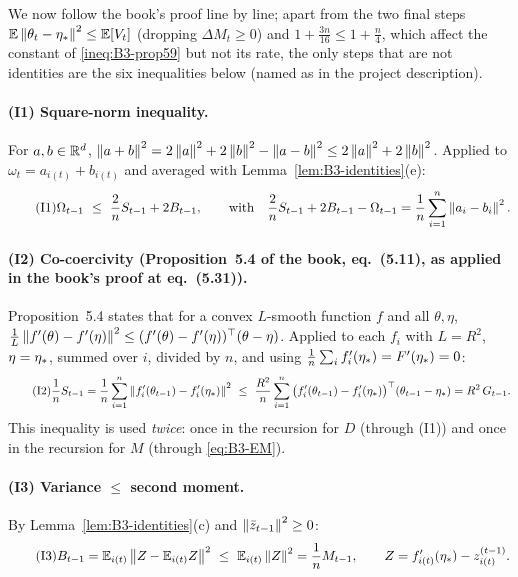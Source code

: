 We now follow the book's proof line by line; apart from the two final steps $\mathbb{E}\left\|\theta_t-\eta_\ast\right\|^2\le\mathbb{E}[V_t]$ (dropping $\Delta M_t\ge0$) and $1+\frac{3n}{16}\le1+\frac n4$, which affect the constant of \eqref{ineq:B3-prop59} but not its rate, the only steps that are not identities are the six inequalities below (named as in the project description).

\paragraph{(I1) Square-norm inequality.} For $a,b\in\mathbb{R}^d$, $\left\|a+b\right\|^2=2\left\|a\right\|^2+2\left\|b\right\|^2-\left\|a-b\right\|^2\le2\left\|a\right\|^2+2\left\|b\right\|^2$. Applied to $\omega_t=a_{i(t)}+b_{i(t)}$ and averaged with Lemma~\ref{lem:B3-identities}(e):
\begin{equation}\label{ineq:B3-I1}\tag{I1}
\Omega_{t-1}\ \le\ \frac2n S_{t-1}+2B_{t-1},\qquad\text{with}\quad \frac2nS_{t-1}+2B_{t-1}-\Omega_{t-1}=\frac1n\sum_{i=1}^n\left\|a_i-b_i\right\|^2 .
\end{equation}

\paragraph{(I2) Co-coercivity (Proposition~5.4 of the book, eq.~(5.11), as applied in the book's proof at eq.~(5.31)).} Proposition~5.4 states that for a convex $L$-smooth function $f$ and all $\theta,\eta$, $\frac1L\left\|f'(\theta)-f'(\eta)\right\|^2\le(f'(\theta)-f'(\eta))^\top(\theta-\eta)$. Applied to each $f_i$ with $L=R^2$, $\eta=\eta_\ast$, summed over $i$, divided by $n$, and using $\frac1n\sum_if'_i(\eta_\ast)=F'(\eta_\ast)=0$:
\begin{equation}\label{ineq:B3-I2}\tag{I2}
\frac1n S_{t-1}=\frac1n\sum_{i=1}^n\norm{\fip(\theta_{t-1})-\fip(\etastar)}^2\ \le\ \frac{R^2}{n}\sum_{i=1}^n\big(\fip(\theta_{t-1})-\fip(\etastar)\big)^\top(\theta_{t-1}-\etastar)=R^2\,G_{t-1}.
\end{equation}
This inequality is used \emph{twice}: once in the recursion for $D$ (through (I1)) and once in the recursion for $M$ (through \eqref{eq:B3-EM}).

\paragraph{(I3) Variance $\le$ second moment.} By Lemma~\ref{lem:B3-identities}(c) and $\left\|\bar z_{t-1}\right\|^2\ge0$:
\begin{equation}\label{ineq:B3-I3}\tag{I3}
B_{t-1}=\mathbb{E}_{i(t)}\left\|Z-\mathbb{E}_{i(t)} Z\right\|^2\ \le\ \mathbb{E}_{i(t)}\left\|Z\right\|^2=\frac1nM_{t-1},\qquad Z=f'_{i(t)}(\eta_\ast)-z^{(t-1)}_{i(t)} .
\end{equation}

